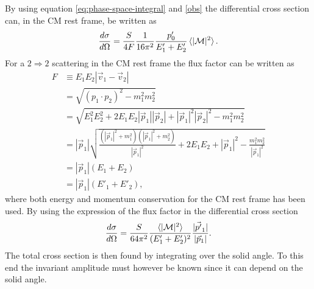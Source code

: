 By using equation \eqref{eq:phase-space-integral} and \eqref{obs} the differential cross section can, in the CM rest frame, be written as
\begin{equation}
	\frac{d\sigma}{d\Omega}=\frac{S}{4F}\frac{1}{16\pi^2}   \frac{p_0'}{E'_1+E'_2}\braket{|\mathcal{M}|^2}.
	\label{shiess}
\end{equation} 
For a $2\Rightarrow 2$ scattering in the CM rest frame the flux factor can be written as
\begin{equation}
	\begin{split}
		F&\equiv E_1E_2|\vec{v}_1-\vec{v}_2|\\
		&=\sqrt{(p_1\cdot p_2)^2-m_1^2m_2^2}\\
		&=\sqrt{E_1^2E_2^2+2E_1E_2|\vec{p}_1||\vec{p}_2|+|\vec{p}_1|^2|\vec{p}_2|^2-m_1^2m_2^2}\\
		&=|\vec{p}_1|\sqrt{\frac{(|\vec{p}_1|^2+m_1^2)(|\vec{p}_1|^2+m_2^2)}{|\vec{p}_1|^2}+2E_1E_2+|\vec{p}_1|^2-\frac{m_1^2m_2^2}{|\vec{p}_1|^2}}\\
		&=|\vec{p}_1|(E_1+E_2)\\
		&=|\vec{p}_1|(E'_1+E'_2),
	\end{split}
\end{equation} 
where both energy and momentum conservation for the CM rest frame has been used. By using the expression of the flux factor in the differential cross section
\begin{equation}
	\frac{d\sigma}{d\Omega}=\frac{S}{64\pi^2}   \frac{\braket{|\mathcal{M}|^2}}{(E'_1+E'_2)^2}\frac{|\vec{p'}_1|}{|\vec{p}_1|}.
	\label{diffcrossmass}
\end{equation} 
The total cross section is then found by integrating over the solid angle. To this end the invariant amplitude must however be known since it can depend on the solid angle.

